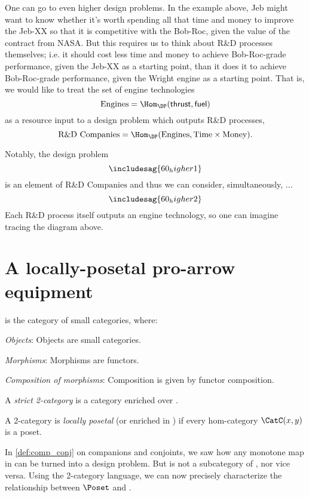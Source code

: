 One can go to even higher design problems. In the example above, Jeb might want to know whether it's worth spending all that time and money to improve the Jeb-XX so that it is competitive with the Bob-Roc, given the value of the contract from NASA. But this requires us to think about R\&D processes themselves; i.e. it should cost less time and money to achieve Bob-Roc-grade performance, given the Jeb-XX as a starting point, than it does it to achieve Bob-Roc-grade performance, given the Wright engine as a starting point. That is, we would like to treat the set of engine technologies
\[\text{Engines} = \Hom_\DP(\mathsf{thrust}, \mathsf{fuel})\]
as a resource input to a design problem which outputs R\&D processes,
\[\text{R\&D Companies} = \Hom_\DP(\text{Engines}, \text{Time} \times \text{Money}).\]

Notably, the design problem
\[
\includesag{60_higher1}
\]
is an element of $\text{R\&D Companies}$ and thus we can consider, simultaneously, ...
\[
\includesag{60_higher2}
\]
Each R\&D process itself outputs an engine technology, so one can imagine tracing the diagram above.

\section{A locally-posetal pro-arrow equipment}
\begin{definition}[\Category]
\Category is the category of small categories, where:
\begin{compactenum}
    \item \emph{Objects}: Objects are small categories.
    \item \emph{Morphisms}: Morphisms are functors.
    \item \emph{Composition of morphisms}: Composition is given by functor composition.
\end{compactenum}
\end{definition}

\begin{definition}[2-category]
A \emph{strict 2-category} is a category enriched over \Category.
\end{definition}

\begin{definition}
\label{def:locallyposetalcat}
A 2-category \CatC is \emph{locally posetal} (or enriched in \Pos) if every hom-category $\CatC(x,y)$ is a poset.
\end{definition}
In \cref{def:comp_conj} on companions and conjoints, we saw how any monotone map in \Pos can be turned into a design problem. But \DP is not a subcategory of \Pos, nor vice versa. Using the 2-category language, we can now precisely characterize the relationship between $\Poset$ and \DP. %

